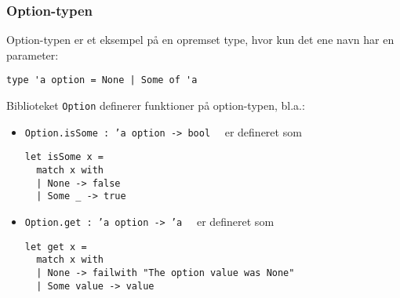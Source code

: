 \documentclass{beamer}
\begin{document}
\begin{frame}[fragile=singleslide]
\frametitle{Option-typen}

Option-typen er et eksempel på en opremset type, hvor kun det ene navn har
en parameter:

\begin{verbatim}
type 'a option = None | Some of 'a
\end{verbatim}

Biblioteket \texttt{Option} definerer funktioner på option-typen, bl.a.:

\begin{itemize}
\item \texttt{Option.isSome : 'a option -> bool}~~ er defineret som

\begin{verbatim}
let isSome x =
  match x with
  | None -> false
  | Some _ -> true
\end{verbatim}

\item \texttt{Option.get : 'a option -> 'a}~~ er defineret som

\begin{verbatim}
let get x =
  match x with
  | None -> failwith "The option value was None"
  | Some value -> value
\end{verbatim}

\end{itemize}

\end{frame}

\end{document}
